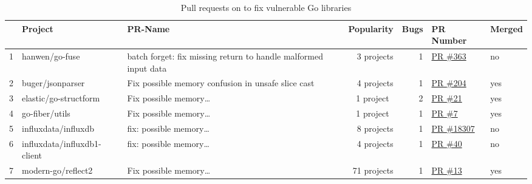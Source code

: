 \begin{table}[htp!]
    \centering
    \caption{Pull requests on \github{} to fix vulnerable Go libraries}
    \label{tbl:pull-requests}
    {\footnotesize
        \begin{tabularx}{\textwidth}{rlXrrll}
        {} & \textbf{Project}             & \textbf{PR-Name}                                                & \textbf{Popularity} & \textbf{Bugs} & \textbf{PR Number}                                                     & \textbf{Merged}  \\
        \hline
        1  & hanwen/go-fuse               & batch forget: fix missing return to handle malformed input data &  3 projects         &  1            & \href{https://www.github.com/hanwen/go-fuse/pull/363}{PR \#363}        & no               \\
        \rowcolor{verylightgray}
        2  & buger/jsonparser             & Fix possible memory confusion in unsafe slice cast              &  4 projects         &  1            & \href{https://www.github.com/buger/jsonparser/pull/204}{PR \#204}      & yes              \\
        3  & elastic/go-structform        & Fix possible memory\ldots                                       &  1 project~         &  2            & \href{https://github.com/elastic/go-structform/pull/21}{PR \#21}       & yes              \\
        \rowcolor{verylightgray}
        4  & go-fiber/utils               & Fix possible memory\ldots                                       &  1 project~         &  1            & \href{https://github.com/gofiber/utils/pull/7}{PR \#7}                 & yes              \\
        5  & influxdata/influxdb          & fix: possible memory\ldots                                      &  8 projects         &  1            & \href{https://github.com/influxdata/influxdb/pull/18307}{PR \#18307}   & no               \\
        \rowcolor{verylightgray}
        6  & influxdata/influxdb1-client  & fix: possible memory\ldots                                      &  4 projects         &  1            & \href{https://github.com/influxdata/influxdb1-client/pull/40}{PR \#40} & no               \\
        7  & modern-go/reflect2           & Fix possible memory\ldots                                       & 71 projects         &  1            & \href{https://github.com/modern-go/reflect2/pull/13}{PR \#13}          & yes              \\

\end{tabularx}}
\end{table}
